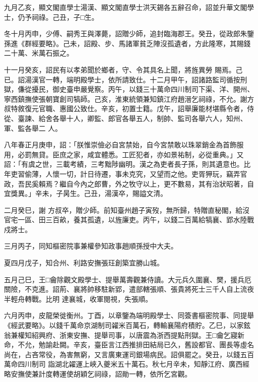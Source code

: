 \begin{pinyinscope}
 九月乙亥，顯文閣直學士湯漢、顯文閣直學士洪天錫各五辭召命，詔並升華文閣學士，仍予祠祿。己丑，子□生。



 冬十月丙申，少傅、嗣秀王與澤薨，詔贈少師，追封臨海郡王。癸丑，從政郎朱鑒孫進《群經要略》。己未，詔殿、步、馬諸軍貧乏陣沒孤遺者，方此隆寒，其賜錢二十萬、米萬石振之。



 十一月癸亥，詔民有以孝弟聞於鄉者，守、令其具名上聞，將旌異勞
 賜焉。己已。詔湯漢官一轉，端明殿學士，依所請致仕。十二月甲午，詔諸路監司循按刑獄，傔從擾民，御史臺申嚴覺察。丙午，以錢三十萬命四川制司下渠、洋、開州、寧西鎮撫使張朝寶創司犒師。己亥，淮東統領兼知鎮江府趙溍乞祠祿，不允。謝方叔特敘復元官職、惠國公致仕。辛亥，初置士籍。戊午，詔舉廉能材堪縣令者，侍從、臺諫、給舍各舉十人，卿監、郎官各舉五人，制帥、監司各舉六人，知州、軍、監各舉二
 人。



 八年春正月庚申，詔：「朕惟崇儉必自宮禁始，自今宮禁敢以珠翠銷金為首飾服用，必罰無貸。臣庶之家，咸宜體悉。工匠犯者，亦如景祐制，必從重典。」又詔：「有虞之世，三載考績，三考黜陟幽明。漢之為吏者長子孫，則其遺意也。比年吏習偷薄，人懷一切，計日待遷，事未克究，又望而之他。吏胥狎玩，竊弄官政，吾民奚賴焉？繼自今內之郎曹，外之牧守以上，更不數易，其有治狀昭著，自宜獎異。」辛未，子昺生。己丑，湯漢卒，賜謚文清。



 二月癸巳，謝
 方叔卒，贈少師。前知臺州趙子寅歿，無所歸，特贈直秘閣，給沒官宅一區、田三百畝，養其孤遺，以旌廉吏。丙午，以錢二百萬給犒襄、郢水陸戰戍將士。



 三月丙子，同知樞密院事兼權參知政事趙順孫授中大夫。



 夏四月戊子，知合州、利路安撫張玨創築宜勝山城。



 五月己巳，王□龠除觀文殿學士、提舉萬壽觀兼侍讀。大元兵久圍襄、樊，援兵厄關險，不克進。詔荊、襄將帥移駐新郢，遣部轄張順、張貴將死士三千人自上流夜半輕舟轉戰。比明
 達襄城，收軍閱視，失張順。



 六月丙申，皮龍榮徙衡州。丁酉，以章鑒為端明殿學士、同簽書樞密院事、同提舉《經武要略》。以錢千萬命京湖制司糴米百萬石，轉輸襄陽府積貯。乙巳，以家鉉翁兼權知紹興府、浙東安撫、提舉司事，以唐震為浙西提點刑獄。王□龠乞寢新命，不允，勉諭赴闕。辛亥，臺臣言江西推排田結局已久，舊設都官、團長等虛名尚在，占吝常役，為害無窮，又言廣東運司銀場病民。詔俱罷之。癸丑，以錢五百萬命四川制司
 詣湖北糴運上峽入夔米五十萬石。秋七月辛未，知靜江府、廣西經略安撫使兼計度轉運使胡穎乞祠祿，詔勛一轉，依所乞宮觀。




\end{pinyinscope}
